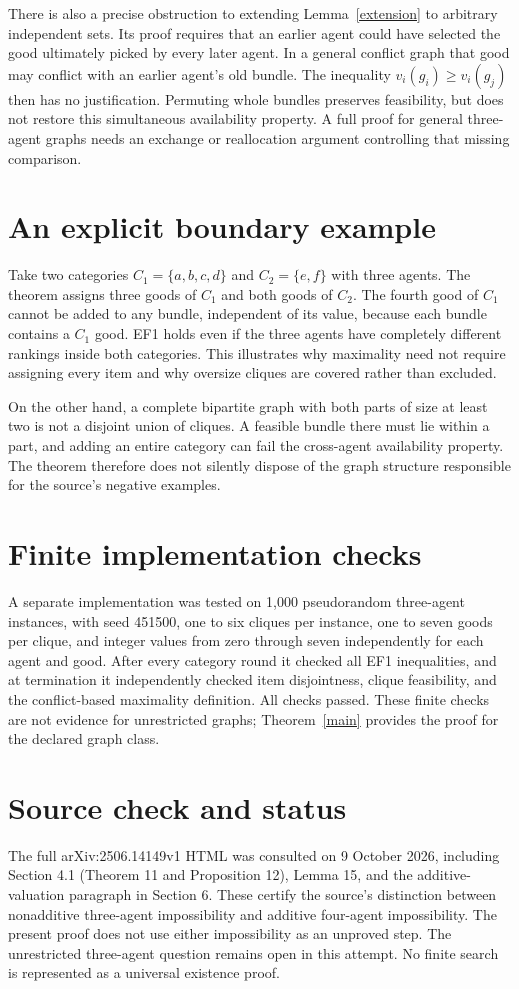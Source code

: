 \documentclass[11pt]{article}
\theoremstyle{remark}
\begin{document}
There is also a precise obstruction to extending Lemma~\ref{extension} to arbitrary independent sets. Its proof requires that an earlier agent could have selected the good ultimately picked by every later agent. In a general conflict graph that good may conflict with an earlier agent's old bundle. The inequality $v_i(g_i)\geq v_i(g_j)$ then has no justification. Permuting whole bundles preserves feasibility, but does not restore this simultaneous availability property. A full proof for general three-agent graphs needs an exchange or reallocation argument controlling that missing comparison.

\section{An explicit boundary example}
Take two categories $C_1=\{a,b,c,d\}$ and $C_2=\{e,f\}$ with three agents. The theorem assigns three goods of $C_1$ and both goods of $C_2$. The fourth good of $C_1$ cannot be added to any bundle, independent of its value, because each bundle contains a $C_1$ good. EF1 holds even if the three agents have completely different rankings inside both categories. This illustrates why maximality need not require assigning every item and why oversize cliques are covered rather than excluded.

On the other hand, a complete bipartite graph with both parts of size at least two is not a disjoint union of cliques. A feasible bundle there must lie within a part, and adding an entire category can fail the cross-agent availability property. The theorem therefore does not silently dispose of the graph structure responsible for the source's negative examples.

\section{Finite implementation checks}
A separate implementation was tested on 1,000 pseudorandom three-agent instances, with seed 451500, one to six cliques per instance, one to seven goods per clique, and integer values from zero through seven independently for each agent and good. After every category round it checked all EF1 inequalities, and at termination it independently checked item disjointness, clique feasibility, and the conflict-based maximality definition. All checks passed. These finite checks are not evidence for unrestricted graphs; Theorem~\ref{main} provides the proof for the declared graph class.

\section{Source check and status}
The full arXiv:2506.14149v1 HTML was consulted on 9 October 2026, including Section 4.1 (Theorem 11 and Proposition 12), Lemma 15, and the additive-valuation paragraph in Section 6. These certify the source's distinction between nonadditive three-agent impossibility and additive four-agent impossibility. The present proof does not use either impossibility as an unproved step. The unrestricted three-agent question remains open in this attempt. No finite search is represented as a universal existence proof.
\end{document}
